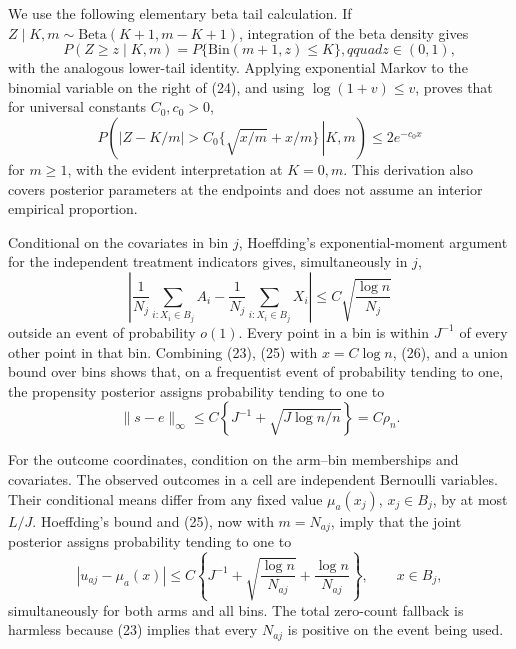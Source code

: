We use the following elementary beta tail calculation.  If \(Z\mid K,m\sim\mathrm{Beta}(K+1,m-K+1)\), integration of the beta density gives
\begin{equation}
 P(Z\ge z\mid K,m)=P\{\mathrm{Bin}(m+1,z)\le K\},qquad z\in(0,1),                     \tag{24}
\end{equation}
with the analogous lower-tail identity.  Applying exponential Markov to the binomial variable on the right of (24), and using
\(\log(1+v)\le v\), proves that for universal constants \(C_0,c_0>0\),
\begin{equation}
 P\!\left(\left.|Z-K/m|>C_0\{\sqrt{x/m}+x/m\}\,\right|K,m\right)
 \le 2e^{-c_0x}                                                                          \tag{25}
\end{equation}
for \(m\ge1\), with the evident interpretation at \(K=0,m\).  This derivation also covers posterior parameters at the endpoints and does not assume an interior empirical proportion.

Conditional on the covariates in bin \(j\), Hoeffding's exponential-moment argument for the independent treatment indicators gives, simultaneously in \(j\),
\begin{equation}
 \left|\frac1{N_j}\sum_{i:X_i\in B_j}A_i-\frac1{N_j}\sum_{i:X_i\in B_j}X_i\right|
 \le C\sqrt{\frac{\log n}{N_j}}                                                         \tag{26}
\end{equation}
outside an event of probability \(o(1)\).  Every point in a bin is within \(J^{-1}\) of every other point in that bin.  Combining (23), (25) with \(x=C\log n\), (26), and a union bound over bins shows that, on a frequentist event of probability tending to one, the propensity posterior assigns probability tending to one to
\begin{equation}
 \|s-e\|_\infty\le C\left\{J^{-1}+\sqrt{J\log n/n}\right\}=C\rho_n.                   \tag{27}
\end{equation}

For the outcome coordinates, condition on the arm--bin memberships and covariates.  The observed outcomes in a cell are independent Bernoulli variables.  Their conditional means differ from any fixed value \(\mu_a(x_j)\), \(x_j\in B_j\), by at most \(L/J\).  Hoeffding's bound and (25), now with \(m=N_{aj}\), imply that the joint posterior assigns probability tending to one to
\begin{equation}
 |u_{aj}-\mu_a(x)|
 \le C\left\{J^{-1}+\sqrt{\frac{\log n}{N_{aj}}}+\frac{\log n}{N_{aj}}\right\},
 \qquad x\in B_j,                                                                        \tag{28}
\end{equation}
simultaneously for both arms and all bins.  The total zero-count fallback is harmless because (23) implies that every \(N_{aj}\) is positive on the event being used.

